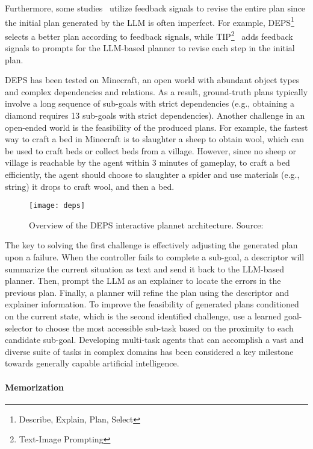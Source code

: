 Furthermore, some studies~\cite{hao2022structured, wang2023describeexplainplanselect} utilize feedback signals to revise the entire plan since the initial plan generated by the LLM is often imperfect.
For example, DEPS\footnote{Describe, Explain, Plan, Select}~\cite{wang2023describeexplainplanselect} selects a better plan according to feedback signals, while TIP\footnote{Text-Image Prompting}~\cite{lu2023multimodal} adds feedback signals to prompts for the LLM-based planner to revise each step in the initial plan.

DEPS has been tested on Minecraft, an open world with abundant object types and complex dependencies and relations.
As a result, ground-truth plans typically involve a long sequence of sub-goals with strict dependencies (e.g., obtaining a diamond requires 13 sub-goals with strict dependencies).
Another challenge in an open-ended world is the feasibility of the produced plans.
For example, the fastest way to craft a bed in Minecraft is to slaughter a sheep to obtain wool, which can be used to craft beds or collect beds from a village.
However, since no sheep or village is reachable by the agent within 3 minutes of gameplay, to craft a bed efficiently, the agent should choose to slaughter a spider and use materials (e.g., string) it drops to craft wool, and then a bed.
\begin{figure}[h!]
	\centering
	\texttt{[image: deps]}
	\caption{Overview of the DEPS interactive plannet architecture. Source: \textcite{wang2023describeexplainplanselect}}
	\label{fig:deps}
\end{figure}
The key to solving the first challenge is effectively adjusting the generated plan upon a failure.
When the controller fails to complete a sub-goal, a descriptor will summarize the current situation as text and send it back to the LLM-based planner.
Then, prompt the LLM as an explainer to locate the errors in the previous plan.
Finally, a planner will refine the plan using the descriptor and explainer information.
To improve the feasibility of generated plans conditioned on the current state, which is the second identified challenge, \textcite{wang2023describeexplainplanselect} use a learned goal-selector to choose the most accessible sub-task based on the proximity to each candidate sub-goal.
Developing multi-task agents that can accomplish a vast and diverse suite of tasks in complex domains has been considered a key milestone towards generally capable artificial intelligence.

\paragraph{Memorization}
\label{par:memorization}

